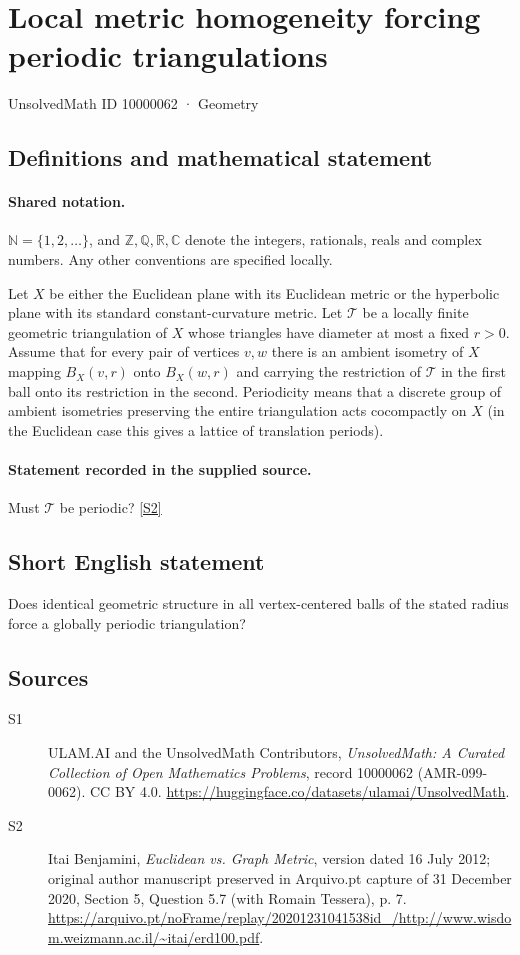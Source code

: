 \documentclass[11pt]{article}
\newcommand{\sref}[2]{\hyperlink{source:#1:#2}{[S#2]}}
\begin{document}
\setcounter{section}{10000061}
\section{Local metric homogeneity forcing periodic triangulations}\label{10000062}
{\small\sffamily UnsolvedMath ID 10000062 · Geometry}
\subsection{Definitions and mathematical statement}

\paragraph{Shared notation.}$\mathbb N=\{1,2,\ldots\}$, and $\mathbb Z,\mathbb Q,\mathbb R,\mathbb C$ denote the integers, rationals, reals and complex numbers. Any other conventions are specified locally.


Let $X$ be either the Euclidean plane with its Euclidean metric or the hyperbolic plane with its standard constant-curvature metric. Let $\mathcal T$ be a locally finite geometric triangulation of $X$ whose triangles have diameter at most a fixed $r>0$. Assume that for every pair of vertices $v,w$ there is an ambient isometry of $X$ mapping $B_X(v,r)$ onto $B_X(w,r)$ and carrying the restriction of $\mathcal T$ in the first ball onto its restriction in the second. Periodicity means that a discrete group of ambient isometries preserving the entire triangulation acts cocompactly on $X$ (in the Euclidean case this gives a lattice of translation periods).
\paragraph{Statement recorded in the supplied source.}
Must $\mathcal T$ be periodic? \sref{10000062}{2}
\subsection{Short English statement}
Does identical geometric structure in all vertex-centered balls of the stated radius force a globally periodic triangulation?
\subsection{Sources}
\begin{description}
\item[\hypertarget{source:10000062:1}{S1}] ULAM.AI and the UnsolvedMath Contributors, \emph{UnsolvedMath: A Curated Collection of Open Mathematics Problems}, record 10000062 (AMR-099-0062). CC BY 4.0. \url{https://huggingface.co/datasets/ulamai/UnsolvedMath}.
\item[\hypertarget{source:10000062:2}{S2}] Itai Benjamini, \emph{Euclidean vs. Graph Metric}, version dated 16 July 2012; original author manuscript preserved in Arquivo.pt capture of 31 December 2020, Section 5, Question 5.7 (with Romain Tessera), p. 7. \url{https://arquivo.pt/noFrame/replay/20201231041538id_/http://www.wisdom.weizmann.ac.il/~itai/erd100.pdf}.
\end{description}
\label{end:10000062}
\end{document}
